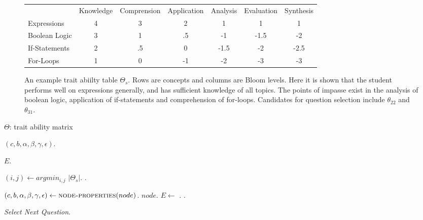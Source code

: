 \documentclass{article}
\begin{document}
 \begin{figure}
  \begin{tabular}{lcccccc}
                 & Knowledge & Comprension & Application & Analysis & Evaluation & Synthesis   \\
   Expressions   &   4       &      3      &      2      &    1     &      1     &      1      \\
   Boolean Logic &   3       &      1      &     .5      &   -1     &     -1.5   &     -2      \\
   If-Statements &   2       &     .5      &      0      &   -1.5   &     -2     &     -2.5    \\
   For-Loops     &   1       &      0      &     -1      &    -2    &     -3     &     -3      \\
  \end{tabular}

  \caption{An example trait abiilty table $\Theta_s$.  Rows are concepts and
  columns are Bloom levels. Here it is shown that the student performs well on
  expressions generally, and has sufficient knowledge of all topics.  The
  points of impasse exist in the analysis of boolean logic, application of
  if-statements and comprehension of for-loops.  Candidates for question
  selection include $\theta_{22}$ and $\theta_{31}$.}

 \end{figure}


  \begin{algorithm}
   \begin{algorithmic}[1]

     \Globals
       \State $\Theta$: trait ability matrix
     \EndGlobals

    \item[]
      \State \Return $(c, b, \alpha, \beta, \gamma, \epsilon)$.
    \EndFunction

    \item[]
      \State \Return $E$.
    \EndFunction

      \State $(i ,j) \gets argmin_{i, j}$ $| \Theta_{s} |$.
      \State {}.
    \EndFunction

    \item[]
      \State $(c, b, \alpha, \beta, \gamma, \epsilon) \gets \Call{node-properties}{node}$.
        \Return $node$.
      \EndIf
      \State $E \gets$ .
         \State {}.  
      \EndFor
    \EndFunction

   \end{algorithmic}
   \caption{\emph{Select Next Question}.}
  \end{algorithm}
\end{document}
